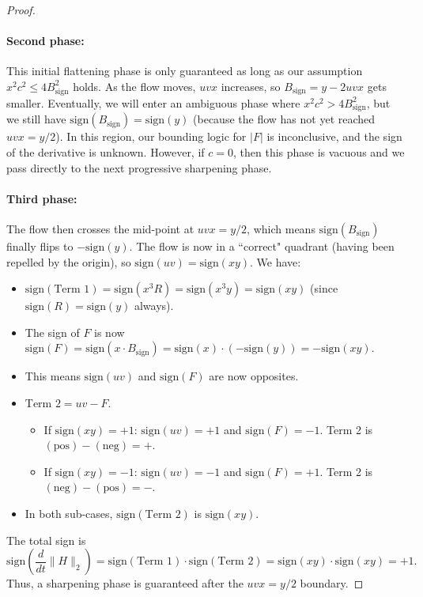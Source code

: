 \documentclass[a4paper,11pt]{article}
\newcommand{\1}{\mathbbm{1}}
\theoremstyle{plain}
\begin{document}
\begin{proof}
\paragraph{Second phase:}
This initial flattening phase is only guaranteed as long as our assumption $x^2c^2 \le 4B_{\text{sign}}^2$ holds.
As the flow moves, $uvx$ increases, so $B_{\text{sign}} = y - 2uvx$ gets smaller. Eventually, we will enter an ambiguous phase where $x^2c^2 > 4B_{\text{sign}}^2$, but we still have $\text{sign}(B_{\text{sign}}) = \text{sign}(y)$ (because the flow has not yet reached $uvx = y/2$).
In this region, our bounding logic for $|F|$ is inconclusive, and the sign of the derivative is unknown. However, if $c = 0$, then this phase is vacuous and we pass directly to the next progressive sharpening phase.



\paragraph{Third phase:}
The flow then crosses the mid-point at $uvx = y/2$, which means $\text{sign}(B_{\text{sign}})$ finally flips to $-\text{sign}(y)$.
The flow is now in a ``correct" quadrant (having been repelled by the origin), so $\text{sign}(uv) = \text{sign}(xy)$. We have:
\begin{itemize}
    \item $\text{sign}(\text{Term 1}) = \text{sign}(x^3 R) = \text{sign}(x^3 y) = \text{sign}(xy)$ (since $\text{sign}(R) = \text{sign}(y)$ always).
    \item The sign of $F$ is now $\text{sign}(F) = \text{sign}(x \cdot B_{\text{sign}}) = \text{sign}(x) \cdot (-\text{sign}(y)) = -\text{sign}(xy)$.
    \item This means $\text{sign}(uv)$ and $\text{sign}(F)$ are now opposites.
    \item $\text{Term 2} = uv - F$.
        \begin{itemize}
            \item If $\text{sign}(xy) = +1$: $\text{sign}(uv) = +1$ and $\text{sign}(F) = -1$. Term 2 is $(\text{pos}) - (\text{neg}) = +$.
            \item If $\text{sign}(xy) = -1$: $\text{sign}(uv) = -1$ and $\text{sign}(F) = +1$. Term 2 is $(\text{neg}) - (\text{pos}) = -$.
        \end{itemize}
    \item In both sub-cases, $\text{sign}(\text{Term 2})$ is $\text{sign}(xy)$.
\end{itemize}
The total sign is
$$
\text{sign}\left(\frac{d}{dt} \|H\|_2\right) = \text{sign}(\text{Term 1}) \cdot \text{sign}(\text{Term 2}) = \text{sign}(xy) \cdot \text{sign}(xy) = +1.
$$
Thus, a sharpening phase is guaranteed after the $uvx = y/2$ boundary.

\end{proof}
\end{document}
